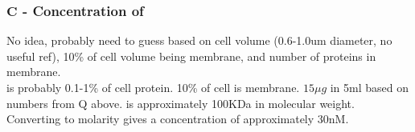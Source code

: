\subsubsection*{$\mathbf{C}$ {\bf- Concentration of \cbbthree{}}}
No idea, probably need to guess based on cell volume (0.6-1.0um diameter, no useful ref), 10\% of cell volume being membrane, and number of proteins in membrane.\\
\cbbthree{} is probably 0.1-1\% of cell protein. 10\% of cell is membrane.
$15\mu g$ in 5ml based on numbers from Q above. \cbbthree{} is approximately 100KDa in molecular weight. Converting to molarity gives a concentration of approximately 30nM.